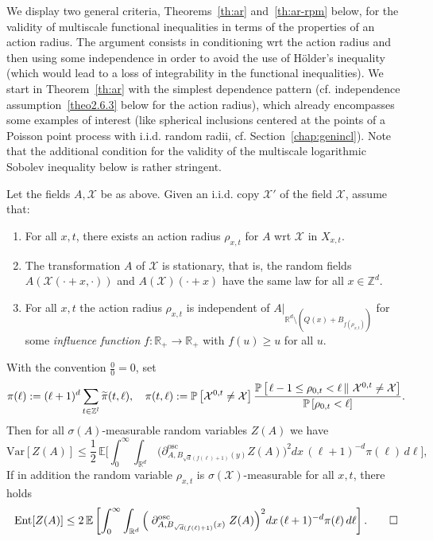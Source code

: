 \documentclass[AHL,Unicode,longabstracts]{cedram}
\newcommand{\R}{\mathbb R}
\newcommand{\Z}{\mathbb Z}
\newcommand{\expecM}[1]{\mathbb{E}\bigg[#1 \bigg]}
\newcommand{\expec}[1]{\mathbb{E}\left[#1 \right]}
\newcommand{\pr}[1]{\mathbb{P}\left[#1 \right]}
\newcommand{\prC}[2]{\mathbb{P}\left[\left. #1 \,\right\|\,#2\right]}
\newcommand{\X}{\mathcal X}
\newcommand{\osc}{\partial^{\mathrm{osc}}}
\newcommand{\oscd}[1]{\mathrel{\osc_{#1}}}
\newcommand{\var}[1]{\mathrm{Var}\left[#1\right]}
\newcommand{\ent}[1]{\mathrm{Ent}\!\left[#1\right]}
\newcommand*{\alphenumi}{\renewcommand*{\theenumi}{\alph{enumi}}}
\let\oldtilde\tilde
\renewcommand*{\tilde}[1]{\mathchoice{\widetilde{#1}}{\widetilde{#1}}{\oldtilde{#1}}{\oldtilde{#1}}}\let\oldhat\hat
\renewcommand*{\hat}[1]{\mathchoice{\widehat{#1}}{\widehat{#1}}{\oldhat{#1}}{\oldhat{#1}}}\let\oldexists\exists
\renewcommand*{\exists}{\mathrel{\oldexists}}
\begin{document}
We display two general criteria, Theorems~\ref{th:ar} and~\ref{th:ar-rpm} below, for the validity of multiscale functional inequalities in terms of the properties of an action radius. The argument consists in conditioning wrt the action radius and then using some independence in order to avoid the use of H\"older's inequality (which would lead to a loss of integrability in the functional inequalities). We start in Theorem~\ref{th:ar} with the simplest dependence pattern (cf. independence assumption~\eqref{theo2.6.3} below for the action radius), which already encompasses some examples of interest (like spherical inclusions centered at the points of a Poisson point process with i.i.d. random radii, cf. Section~\ref{chap:genincl}). Note that the additional condition for the validity of the multiscale logarithmic Sobolev inequality below is rather stringent.
\begin{theo}\label{th:ar}
Let the fields $A,\X$ be as above. Given an i.i.d. copy $\X'$ of the field $\X$, assume that:
\begin{enumerate} \alphenumi 
\item \label{theo2.6.1}For all $x,t$, there exists an action radius $\rho_{x,t}$ for $A$ wrt $\X$ in $X_{x,t}$.
\item \label{theo2.6.2}The transformation $A$ of $\X$ is stationary, that is, the random fields\linebreak $A(\X(\cdot+x,\cdot))$ and $A(\X)(\cdot+x)$ have the same law for all $x\in\Z^d$.
\item \label{theo2.6.3}For all $x,t$ the action radius $\rho_{x,t}$ is independent of $A|_{\R^d\setminus (Q(x)+B_{f(\rho_{x,t})})}$ for some \emph{influence function} $f:\R_+\to\R_+$ with $f(u)\ge u$ for all $u$.
\end{enumerate}
With the convention $\frac00=0$, set
\[
\pi(\ell):=(\ell+1)^{d}\sum_{t\in\Z^l}\tilde\pi(t,\ell),\quad
\pi(t,\ell):=\pr{\X^{0,t}\ne \X}\frac{\prC{\ell-1\le\rho_{0,t}<\ell}{\X^{0,t}\ne \X}}{\pr{\rho_{0,t}<\ell}}.
\]
Then for all $\sigma(A)$-measurable random variables $Z(A)$ we have
\begin{equation}\label{eq:arwsg2}
\var{Z(A)}\le\frac12\,\expecM{\int_0^\infty\int_{\R^d}\,\Big(\oscd{A,B_{\sqrt d(f(\ell)+1)}(y)}Z(A)\Big)^2dx\,(\ell+1)^{-d} \pi(\ell)\,d\ell},
\end{equation}
If in addition the random variable $\rho_{x,t}$ is $\sigma(\X)$-measurable for all $x,t$, there holds
\begin{equation}
\ent{Z(A)}\le2\,\expec{ \int_{0}^\infty \int_{\R^d}\Big(\oscd{A,B_{\sqrt{d}(f(\ell)+1)}(x)}Z(A)\Big)^2dx\,(\ell+1)^{-d}\pi(\ell)\,d\ell}.\label{eq:arlsi2}
\qedhere
\end{equation}

\end{theo}
\end{document}
